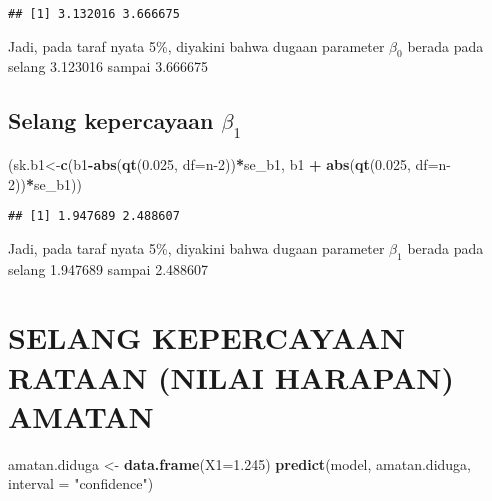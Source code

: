 \documentclass[
]{article}
\newenvironment{Shaded}{\begin{snugshade}}{\end{snugshade}}
\newcommand{\AttributeTok}[1]{\textcolor[rgb]{0.13,0.29,0.53}{#1}}
\newcommand{\DecValTok}[1]{\textcolor[rgb]{0.00,0.00,0.81}{#1}}
\newcommand{\FloatTok}[1]{\textcolor[rgb]{0.00,0.00,0.81}{#1}}
\newcommand{\FunctionTok}[1]{\textcolor[rgb]{0.13,0.29,0.53}{\textbf{#1}}}
\newcommand{\NormalTok}[1]{#1}
\newcommand{\OtherTok}[1]{\textcolor[rgb]{0.56,0.35,0.01}{#1}}
\newcommand{\SpecialCharTok}[1]{\textcolor[rgb]{0.81,0.36,0.00}{\textbf{#1}}}
\newcommand{\StringTok}[1]{\textcolor[rgb]{0.31,0.60,0.02}{#1}}
\begin{document}
\begin{verbatim}
## [1] 3.132016 3.666675
\end{verbatim}

Jadi, pada taraf nyata 5\%, diyakini bahwa dugaan parameter \(\beta_0\)
berada pada selang 3.123016 sampai 3.666675

\hypertarget{selang-kepercayaan-beta_1}{%
\subsection{\texorpdfstring{ Selang kepercayaan
\(\beta_1\)}{ Selang kepercayaan \textbackslash beta\_1}}\label{selang-kepercayaan-beta_1}}

\begin{Shaded}
\begin{Highlighting}[]
\NormalTok{(sk.b1}\OtherTok{\textless{}{-}}\FunctionTok{c}\NormalTok{(b1}\SpecialCharTok{{-}}\FunctionTok{abs}\NormalTok{(}\FunctionTok{qt}\NormalTok{(}\FloatTok{0.025}\NormalTok{, }\AttributeTok{df=}\NormalTok{n}\DecValTok{{-}2}\NormalTok{))}\SpecialCharTok{*}\NormalTok{se\_b1, b1 }\SpecialCharTok{+} \FunctionTok{abs}\NormalTok{(}\FunctionTok{qt}\NormalTok{(}\FloatTok{0.025}\NormalTok{, }\AttributeTok{df=}\NormalTok{n}\DecValTok{{-}2}\NormalTok{))}\SpecialCharTok{*}\NormalTok{se\_b1))}
\end{Highlighting}
\end{Shaded}

\begin{verbatim}
## [1] 1.947689 2.488607
\end{verbatim}

Jadi, pada taraf nyata 5\%, diyakini bahwa dugaan parameter \(\beta_1\)
berada pada selang 1.947689 sampai 2.488607

\hypertarget{selang-kepercayaan-rataan-nilai-harapan-amatan}{%
\section{\texorpdfstring{ SELANG KEPERCAYAAN RATAAN (NILAI HARAPAN)
AMATAN}{ SELANG KEPERCAYAAN RATAAN (NILAI HARAPAN) AMATAN}}\label{selang-kepercayaan-rataan-nilai-harapan-amatan}}

\begin{Shaded}
\begin{Highlighting}[]
\NormalTok{amatan.diduga }\OtherTok{\textless{}{-}} \FunctionTok{data.frame}\NormalTok{(}\AttributeTok{X1=}\FloatTok{1.245}\NormalTok{)}
\FunctionTok{predict}\NormalTok{(model, amatan.diduga, }\AttributeTok{interval =} \StringTok{"confidence"}\NormalTok{)}
\end{Highlighting}
\end{Shaded}
\end{document}
